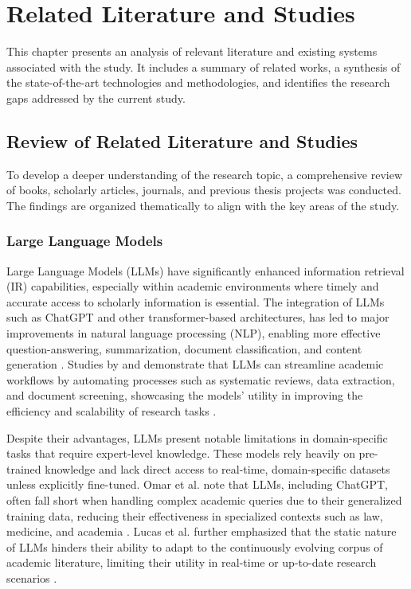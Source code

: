 \chapter{Related Literature and Studies}
\begin{refsection}

This chapter presents an analysis of relevant literature and existing systems associated with the study. It includes a summary of related works, a synthesis of the state-of-the-art technologies and methodologies, and identifies the research gaps addressed by the current study.


\section{Review of Related Literature and Studies}

To develop a deeper understanding of the research topic, a comprehensive review of books, scholarly articles, journals, and previous thesis projects was conducted. The findings are organized thematically to align with the key areas of the study.


\subsection{Large Language Models}

\hspace{1cm}Large Language Models (LLMs) have significantly enhanced information retrieval (IR) capabilities, especially within academic environments where timely and accurate access to scholarly information is essential. The integration of LLMs such as ChatGPT and other transformer-based architectures, has led to major improvements in natural language processing (NLP), enabling more effective question-answering, summarization, document classification, and content generation \cite{yalamanchili2024quality} \cite{yang2023large}. Studies by \citeauthor{khraisha2024can} \citeyear{khraisha2024can} and \citeauthor{gartlehner2023data} \citeyear{gartlehner2023data}demonstrate that LLMs can streamline academic workflows by automating processes such as systematic reviews, data extraction, and document screening, showcasing the models' utility in improving the efficiency and scalability of research tasks \cite{khraisha2024can}  \cite{gartlehner2023data}.

\hspace{0.4cm}Despite their advantages, LLMs present notable limitations in domain-specific tasks that require expert-level knowledge. These models rely heavily on pre-trained knowledge and lack direct access to real-time, domain-specific datasets unless explicitly fine-tuned. Omar et al. note that LLMs, including ChatGPT, often fall short when handling complex academic queries due to their generalized training data, reducing their effectiveness in specialized contexts such as law, medicine, and academia \cite{khraisha2024can}. Lucas et al. further emphasized that the static nature of LLMs hinders their ability to adapt to the continuously evolving corpus of academic literature, limiting their utility in real-time or up-to-date research scenarios \cite{gartlehner2023data}.


\end{refsection}
